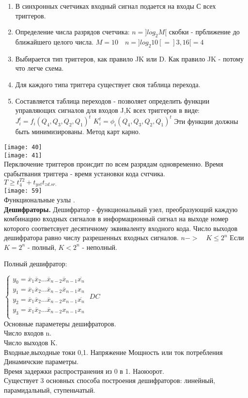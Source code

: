 \begin{enumerate}
  \item В синхронных счетчиках входный сигнал подается на входы С всех триггеров.
  \item Определение числа разрядов счетчика: $n = ]log_2 M[$ скобки - прближение до ближайшего целого числа.
  $M =10 \quad n = ]log_2 10 [ = ]3,16[ = 4 $
  \item Выбирается тип триггеров, как правило JK или D.
  Как правило JK - потому что легче схема.
  \item Для каждого типа триггера существует своя таблица перехода.
  \item Составляется таблица переходов - позволяет определить функции управляющих сигналов для входов J,K всех триггеров в виде:
  $ J_i^t = f_i(Q_4,Q_3,Q_2,Q_1)^t$  $ K_i^t = \phi_i(Q_4,Q_3,Q_2,Q_1)^t$
  Эти функции должны быть минимизированы. Метод карт карно.
\end{enumerate}
\texttt{[image: 40]}\\
\texttt{[image: 41]}\\
Перключение триггеров происдит по всем разрядам одновременно.
Время срабытвания триггера - время установки кода счтчика.\\
$T \geq t_4^{T2} + t_{yst} t_{zd.sr.}$\\
\texttt{[image: 59]}\\


Функциональные узлы .\\
\textbf{Дешифраторы.}
Дешифратор - функциональный узел, преобразующий каждую комбинацию входных сигналов в информационный
сигнал на выходе номер которого соответсвует десятичному эквиваленту входного кода.
Число выходов дешифратора равно числу разрешенных входных сигналов. $ n -> \quad K \leq 2^n$ Если  $K = 2^n$ - полный,  $K < 2^n$ - неполный.

Полный дешифратор:

$\begin{cases}
  y_0 = \overline{x}_1 \overline{x}_2 ... \overline{x}_{n-2} \overline{x}_{n-1} \overline{x_n} \\
  y_1 = \overline{x}_1 \overline{x}_2 ... \overline{x}_{n-2} \overline{x}_{n-1} {x_n}\\
  y_2=  \overline{x}_1 \overline{x}_2 ... \overline{x}_{n-2} x_{n-1} \overline{x_n}\\
  y_3=  \overline{x}_1 \overline{x}_2 ... \overline{x}_{n-2} x_{n-1} {x_n} \\

\end{cases}$
$DC $\\
Основные параметеры дешифраторов.\\
Число входов n.\\
Число выходов K.\\
Входные,выходные токи 0,1.
Напряжение
Мощность или ток потребления \\

Динамичские параметры.\\
Время задержки распространения из 0 в 1. Наоюорот.\\

Существует 3 основных способа построения дешифраторов: линейный, парамидальный, ступеньчатый.
